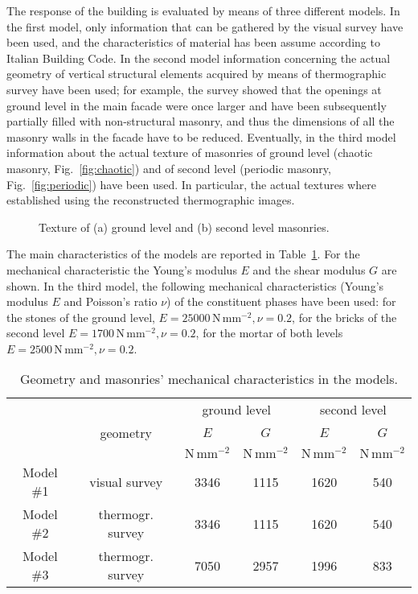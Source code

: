 \documentclass[11pt,a4paper]{article}
\begin{document}
The response of the building is evaluated by means of three different models.
In the first model, only information that can be gathered by the visual survey have been used, and the characteristics of material has been assume according to Italian Building Code. 
In the second model information concerning the actual geometry of vertical structural elements acquired by means of thermographic survey have been used; 
for example, the survey showed that the openings at ground level in the main facade were once larger and have been subsequently partially filled with non-structural masonry, and thus the dimensions of all the masonry walls in the facade have to be reduced.
Eventually, in the third model information about the actual texture of masonries of ground level (chaotic masonry, Fig.~\ref{fig:chaotic}) and of second level (periodic masonry, Fig.~\ref{fig:periodic}) have been used. 
In particular, the actual textures where established using the reconstructed thermographic images. 

\begin{figure}[!ht]
\centering
{}
\hskip0.8cm
\caption{{\small Texture of (a) ground level and (b) second level masonries.}}
\label{fig:masonries}
\end{figure}

The main characteristics of the models are reported in Table~\ref{tab:char_models}.
For the mechanical characteristic the Young's modulus $E$ and the shear modulus $G$ are shown.
In the third model, the following mechanical characteristics (Young's modulus $E$ and Poisson's ratio $\nu$) of the constituent phases have been used: for the stones of the ground level, $E = 25000\,\mathrm{N\,mm^{-2}}, \nu = 0.2$, for the bricks of the second level $E = 1700\,\mathrm{N\,mm^{-2}}, \nu = 0.2$, for the mortar of both levels  $E = 2500\,\mathrm{N\,mm^{-2}}, \nu = 0.2$.

\begin{table}[!ht]
\center
{\small
\begin{tabular}{c|c|cc|cc}
\hline
 & & \multicolumn{2}{|c}{ground level} & \multicolumn{2}{|c}{second level}\\
 & geometry & $E$ & $G$ & $E$ & $G$ \\
 & & $\mathrm{N\,mm^{-2}}$ & $\mathrm{N\,mm^{-2}}$ & $\mathrm{N\,mm^{-2}}$ & $\mathrm{N\,mm^{-2}}$ \\
\hline
 Model \#1 & visual survey & 3346 & 1115 & 1620 & 540 \\
 Model \#2 & thermogr. survey & 3346 & 1115 & 1620 & 540 \\
 Model \#3 & thermogr. survey & 7050 & 2957 & 1996 & 833 \\
 \hline\end{tabular}
}
\caption{{\small Geometry and masonries' mechanical characteristics in the models.}}
\label{tab:char_models}
\end{table}
\end{document}
